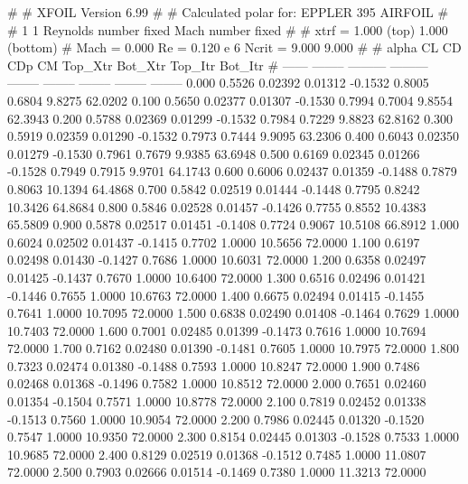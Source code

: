 #  
#       XFOIL         Version 6.99
#  
# Calculated polar for: EPPLER 395 AIRFOIL                              
#  
# 1 1 Reynolds number fixed          Mach number fixed         
#  
# xtrf =   1.000 (top)        1.000 (bottom)  
# Mach =   0.000     Re =     0.120 e 6     Ncrit =   9.000  9.000
#  
#   alpha    CL        CD       CDp       CM     Top_Xtr  Bot_Xtr  Top_Itr  Bot_Itr
#  ------ -------- --------- --------- -------- -------- -------- -------- --------
   0.000   0.5526   0.02392   0.01312  -0.1532   0.8005   0.6804   9.8275  62.0202
   0.100   0.5650   0.02377   0.01307  -0.1530   0.7994   0.7004   9.8554  62.3943
   0.200   0.5788   0.02369   0.01299  -0.1532   0.7984   0.7229   9.8823  62.8162
   0.300   0.5919   0.02359   0.01290  -0.1532   0.7973   0.7444   9.9095  63.2306
   0.400   0.6043   0.02350   0.01279  -0.1530   0.7961   0.7679   9.9385  63.6948
   0.500   0.6169   0.02345   0.01266  -0.1528   0.7949   0.7915   9.9701  64.1743
   0.600   0.6006   0.02437   0.01359  -0.1488   0.7879   0.8063  10.1394  64.4868
   0.700   0.5842   0.02519   0.01444  -0.1448   0.7795   0.8242  10.3426  64.8684
   0.800   0.5846   0.02528   0.01457  -0.1426   0.7755   0.8552  10.4383  65.5809
   0.900   0.5878   0.02517   0.01451  -0.1408   0.7724   0.9067  10.5108  66.8912
   1.000   0.6024   0.02502   0.01437  -0.1415   0.7702   1.0000  10.5656  72.0000
   1.100   0.6197   0.02498   0.01430  -0.1427   0.7686   1.0000  10.6031  72.0000
   1.200   0.6358   0.02497   0.01425  -0.1437   0.7670   1.0000  10.6400  72.0000
   1.300   0.6516   0.02496   0.01421  -0.1446   0.7655   1.0000  10.6763  72.0000
   1.400   0.6675   0.02494   0.01415  -0.1455   0.7641   1.0000  10.7095  72.0000
   1.500   0.6838   0.02490   0.01408  -0.1464   0.7629   1.0000  10.7403  72.0000
   1.600   0.7001   0.02485   0.01399  -0.1473   0.7616   1.0000  10.7694  72.0000
   1.700   0.7162   0.02480   0.01390  -0.1481   0.7605   1.0000  10.7975  72.0000
   1.800   0.7323   0.02474   0.01380  -0.1488   0.7593   1.0000  10.8247  72.0000
   1.900   0.7486   0.02468   0.01368  -0.1496   0.7582   1.0000  10.8512  72.0000
   2.000   0.7651   0.02460   0.01354  -0.1504   0.7571   1.0000  10.8778  72.0000
   2.100   0.7819   0.02452   0.01338  -0.1513   0.7560   1.0000  10.9054  72.0000
   2.200   0.7986   0.02445   0.01320  -0.1520   0.7547   1.0000  10.9350  72.0000
   2.300   0.8154   0.02445   0.01303  -0.1528   0.7533   1.0000  10.9685  72.0000
   2.400   0.8129   0.02519   0.01368  -0.1512   0.7485   1.0000  11.0807  72.0000
   2.500   0.7903   0.02666   0.01514  -0.1469   0.7380   1.0000  11.3213  72.0000
